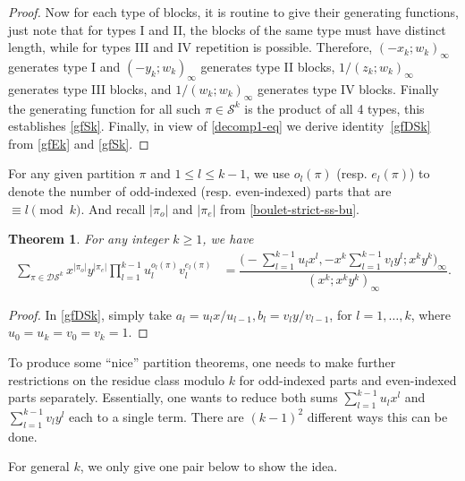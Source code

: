 \documentclass[12pt]{amsart}
\numberwithin{equation}{section}
\theoremstyle{plain}
\newtheorem{theorem}{Theorem}[section]
\theoremstyle{definition}
\begin{document}
\begin{proof}
Now for each type of blocks, it is routine to give their generating functions, just note that for types 
I and II,  the blocks of the same type must have distinct length, while for types III and IV
 repetition is possible. Therefore, $(-x_k;w_k)_{\infty}$ generates type 
 I and $( -y_k;w_k)_{\infty}$   generates type II blocks, 
  $1/(z_k;w_k)_{\infty}$ generates type III blocks, 
 and $1/(w_k;w_k)_{\infty}$ generates type IV blocks. 
 Finally the generating function for all such $\pi\in\mathcal{S}^k$ 
   is the product of all 4 types, this establishes \eqref{gfSk}.
   Finally, in view of \eqref{decomp1-eq}  we derive  identity~\eqref{gfDSk} from \eqref{gfEk}  and \eqref{gfSk}.
\end{proof}

 For any given partition $\pi$ and $1\leq l\leq k-1$, we use $o_{l}(\pi)$ (resp. $e_{l}(\pi)$) to denote the number of odd-indexed (resp. even-indexed) parts that are $\equiv l \pmod k$. And recall $|\pi_{o}|$ and $|\pi_{e}|$ from \eqref{boulet-strict-ss-bu}.

\begin{theorem}\label{main2}
For any integer $k\geq 1$, we have
\begin{align}\label{gfDSkeva}
\sum\limits_{\pi\in\mathcal{DS}^k}x^{|\pi_{o}|}y^{|\pi_{e}|}\prod\limits_{l=1}^{k-1}u_l^{o_l(\pi)}v_l^{e_l(\pi)}
&=\dfrac{\biggl(-\sum\limits_{l=1}^{k-1}u_lx^l,-x^k\sum\limits_{l=1}^{k-1}v_ly^l;x^ky^k\biggr)_{\infty}}{(x^k;x^ky^k)_{\infty}}.
\end{align}
\end{theorem}
\begin{proof}
In \eqref{gfDSk}, simply take $a_l=u_lx/u_{l-1},b_l=v_ly/v_{l-1}$, for $l=1,\ldots,k$, where $u_0=u_k=v_0=v_k=1$.
\end{proof}

To produce some ``nice'' partition theorems, one needs to make further restrictions on the residue class modulo $k$ for odd-indexed parts and even-indexed parts separately. Essentially, one wants to reduce both sums $\sum\limits_{l=1}^{k-1}u_lx^l$ and $\sum\limits_{l=1}^{k-1}v_ly^l$ each to a single term. There are $(k-1)^2$ different ways this can be done. 

For general $k$, we only give one pair below to show the idea. 
\end{document}
